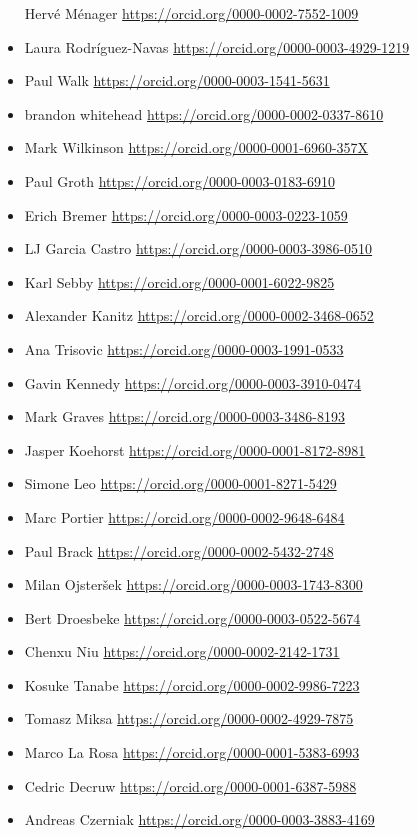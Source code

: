 \begin{itemize}
  Hervé Ménager \url{https://orcid.org/0000-0002-7552-1009}
\item
  Laura Rodríguez-Navas \url{https://orcid.org/0000-0003-4929-1219}
\item
  Paul Walk \url{https://orcid.org/0000-0003-1541-5631}
\item
  brandon whitehead \url{https://orcid.org/0000-0002-0337-8610}
\item
  Mark Wilkinson \url{https://orcid.org/0000-0001-6960-357X}
\item
  Paul Groth \url{https://orcid.org/0000-0003-0183-6910}
\item
  Erich Bremer \url{https://orcid.org/0000-0003-0223-1059}
\item
  LJ Garcia Castro \url{https://orcid.org/0000-0003-3986-0510}
\item
  Karl Sebby \url{https://orcid.org/0000-0001-6022-9825}
\item
  Alexander Kanitz \url{https://orcid.org/0000-0002-3468-0652}
\item
  Ana Trisovic \url{https://orcid.org/0000-0003-1991-0533}
\item
  Gavin Kennedy \url{https://orcid.org/0000-0003-3910-0474}
\item
  Mark Graves \url{https://orcid.org/0000-0003-3486-8193}
\item
  Jasper Koehorst \url{https://orcid.org/0000-0001-8172-8981}
\item
  Simone Leo \url{https://orcid.org/0000-0001-8271-5429}
\item
  Marc Portier \url{https://orcid.org/0000-0002-9648-6484}
\item
  Paul Brack \url{https://orcid.org/0000-0002-5432-2748}
\item
  Milan Ojsteršek \url{https://orcid.org/0000-0003-1743-8300}
\item
  Bert Droesbeke \url{https://orcid.org/0000-0003-0522-5674}
\item
  Chenxu Niu \url{https://orcid.org/0000-0002-2142-1731}
\item
  Kosuke Tanabe \url{https://orcid.org/0000-0002-9986-7223}
\item
  Tomasz Miksa \url{https://orcid.org/0000-0002-4929-7875}
\item
  Marco La Rosa \url{https://orcid.org/0000-0001-5383-6993}
\item
  Cedric Decruw \url{https://orcid.org/0000-0001-6387-5988}
\item
  Andreas Czerniak \url{https://orcid.org/0000-0003-3883-4169}

\end{itemize}
